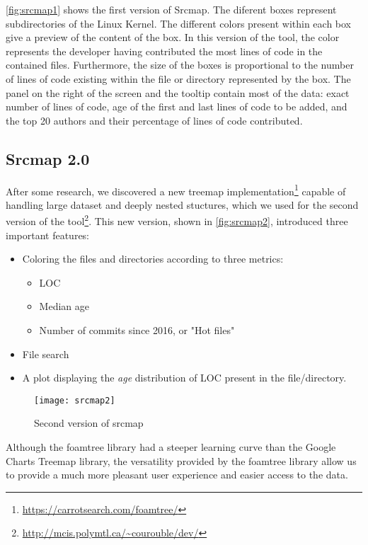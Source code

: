 \autoref{fig:srcmap1} shows the first version of Srcmap. The diferent boxes represent subdirectories of the Linux Kernel. The different colors present within each box give a preview of the content of the box. In this version of the tool, the color represents the developer having contributed the most lines of code in the contained files. Furthermore, the size of the boxes is proportional to the number of lines of code existing within the file or directory represented by the box. The panel on the right of the screen and the tooltip contain most of the data: exact number of lines of code, age of the first and last lines of code to be added, and the top 20 authors and their percentage of lines of code contributed.


\subsection{Srcmap 2.0}


After some research, we discovered a new treemap implementation\footnote{\url{https://carrotsearch.com/foamtree/}} capable of handling large dataset and deeply nested stuctures, which we used for the second version of the tool\footnote{\url{http://mcis.polymtl.ca/~courouble/dev/}}. This new version, shown in \autoref{fig:srcmap2}, introduced three important features: 
\begin{itemize}
	\item Coloring the files and directories according to three metrics:
	\begin{itemize}
		\item \ac{LOC}
		\item Median age
		\item Number of commits since 2016, or "Hot files"
	\end{itemize}
	\item File search
	\item A plot displaying the \textit{age} distribution of \ac{LOC} present in the file/directory.
\end{itemize}

\begin{figure}[htb]
\centering
\texttt{[image: srcmap2]}
\caption{Second version of srcmap}
\label{fig:srcmap2}
\end{figure}

Although the foamtree library had a steeper learning curve than the Google Charts Treemap library, the versatility provided by the foamtree library allow us to provide a much more pleasant user experience and easier access to the data.


